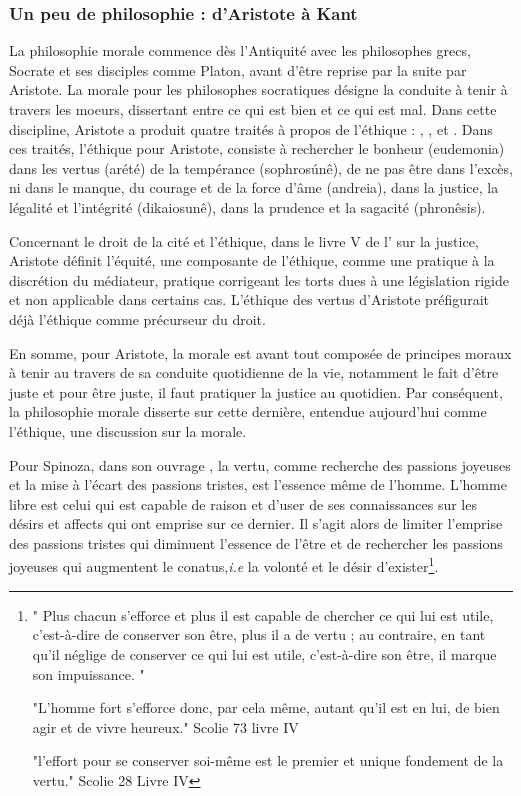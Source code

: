 \subsubsection{Un peu de philosophie : d'Aristote à Kant}

La philosophie morale commence dès l'Antiquité avec les philosophes grecs, Socrate et ses disciples comme Platon, avant d'être reprise par la suite par Aristote. La morale pour les philosophes socratiques désigne la conduite à tenir à travers les moeurs, dissertant entre ce qui est bien et ce qui est mal. Dans cette discipline, Aristote a produit quatre traités à propos de l'éthique : , ,  et . Dans ces traités, l'éthique pour Aristote, consiste à rechercher le bonheur (eudemonia) dans les vertus (arété) de la tempérance (sophrosúnê), de ne pas être dans l'excès, ni dans le manque, du courage et de la force d'âme (andreia), dans la justice, la légalité et l'intégrité (dikaiosunê), dans la prudence et la sagacité (phronêsis).

Concernant le droit de la cité et l'éthique, dans le livre V de l' sur la justice, Aristote définit l'équité, une composante de l'éthique, comme une pratique à la discrétion du médiateur, pratique corrigeant les torts dues à une législation rigide et non applicable dans certains cas. L'éthique des vertus d'Aristote préfigurait déjà l'éthique comme précurseur du droit.

En somme, pour Aristote, la morale est avant tout composée de principes moraux à tenir au travers de sa conduite quotidienne de la vie, notamment le fait d'être juste et pour être juste, il faut pratiquer la justice au quotidien. Par conséquent, la philosophie morale disserte sur cette dernière, entendue aujourd'hui comme l'éthique, une discussion sur la morale.


Pour Spinoza, dans son ouvrage , la vertu, comme recherche des passions joyeuses et la mise à l'écart des passions tristes, est l'essence même de l'homme. L'homme libre est celui qui est capable de raison et d'user de ses connaissances sur les désirs et affects qui ont emprise sur ce dernier. Il s'agit alors de limiter l'emprise des passions tristes qui diminuent l'essence de l'être et de rechercher les passions joyeuses qui augmentent le conatus,\textit{i.e} la volonté et le désir d'exister\footnote{"
Plus chacun s'efforce et plus il est capable de chercher ce qui lui est utile, c'est-à-dire de conserver son être, plus il a de vertu ; au contraire, en tant qu'il néglige de conserver ce qui lui est utile, c'est-à-dire son être, il marque son impuissance.
"

"L'homme fort s'efforce donc, par cela même, autant qu'il est en lui, de bien agir et de vivre heureux." Scolie 73 livre IV

"l'effort pour se conserver soi-même est le premier et unique fondement de la vertu." Scolie 28 Livre IV}.



